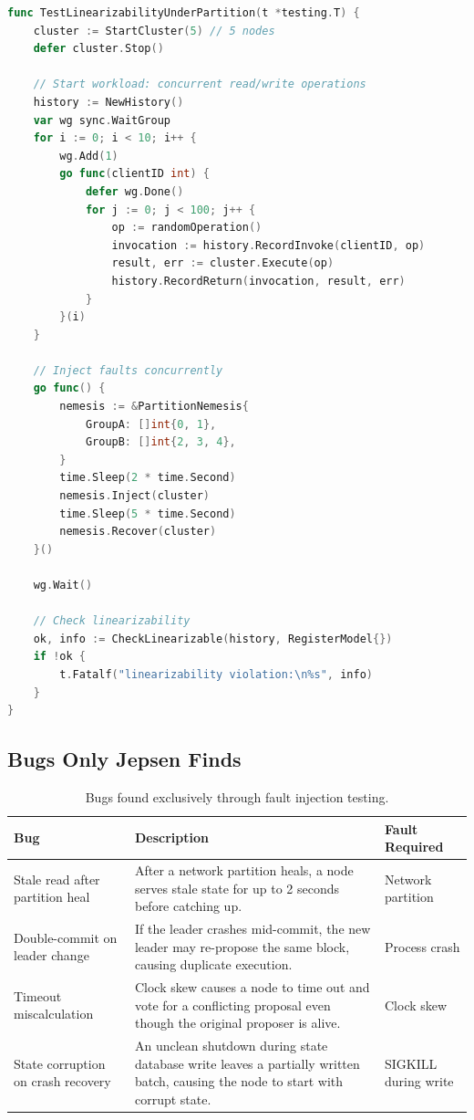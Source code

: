 \documentclass[11pt,a4paper]{article}
\begin{document}
\begin{lstlisting}[language=Go,caption={Linearizability check}]
func TestLinearizabilityUnderPartition(t *testing.T) {
    cluster := StartCluster(5) // 5 nodes
    defer cluster.Stop()

    // Start workload: concurrent read/write operations
    history := NewHistory()
    var wg sync.WaitGroup
    for i := 0; i < 10; i++ {
        wg.Add(1)
        go func(clientID int) {
            defer wg.Done()
            for j := 0; j < 100; j++ {
                op := randomOperation()
                invocation := history.RecordInvoke(clientID, op)
                result, err := cluster.Execute(op)
                history.RecordReturn(invocation, result, err)
            }
        }(i)
    }

    // Inject faults concurrently
    go func() {
        nemesis := &PartitionNemesis{
            GroupA: []int{0, 1},
            GroupB: []int{2, 3, 4},
        }
        time.Sleep(2 * time.Second)
        nemesis.Inject(cluster)
        time.Sleep(5 * time.Second)
        nemesis.Recover(cluster)
    }()

    wg.Wait()

    // Check linearizability
    ok, info := CheckLinearizable(history, RegisterModel{})
    if !ok {
        t.Fatalf("linearizability violation:\n%s", info)
    }
}
\end{lstlisting}

\subsection{Bugs Only Jepsen Finds}

\begin{table}[H]
\centering
\small
\begin{tabular}{@{}lp{7cm}l@{}}
\toprule
\textbf{Bug} & \textbf{Description} & \textbf{Fault Required} \\
\midrule
Stale read after partition heal & After a network partition heals, a node serves stale state for up to 2 seconds before catching up. & Network partition \\
Double-commit on leader change & If the leader crashes mid-commit, the new leader may re-propose the same block, causing duplicate execution. & Process crash \\
Timeout miscalculation & Clock skew causes a node to time out and vote for a conflicting proposal even though the original proposer is alive. & Clock skew \\
State corruption on crash recovery & An unclean shutdown during state database write leaves a partially written batch, causing the node to start with corrupt state. & SIGKILL during write \\
\bottomrule
\end{tabular}
\caption{Bugs found exclusively through fault injection testing.}
\end{table}
\end{document}
